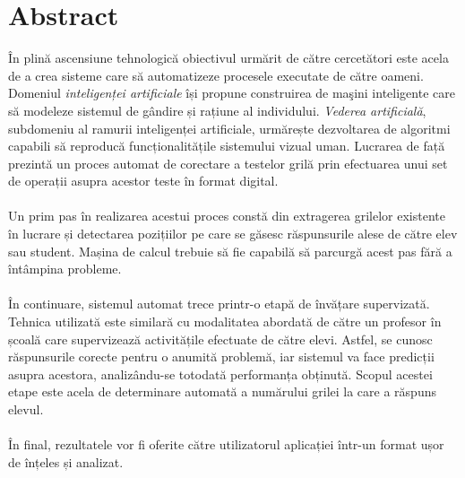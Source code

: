 \documentclass[a4paper,12pt]{report}
\newcommand\tab[1][1cm]{\hspace*{#1}}
\begin{document}
\chapter*{Abstract}
\vspace{2cm}
\tab În plină ascensiune tehnologică obiectivul urmărit de către cercetători este acela de a crea sisteme care să automatizeze procesele executate de către oameni. Domeniul \textit{inteligenței artificiale} își propune construirea de maşini inteligente care să modeleze sistemul de gândire și rațiune al individului. \textit{Vederea artificială}, subdomeniu al ramurii inteligenței artificiale, urmărește dezvoltarea de algoritmi capabili să reproducă funcționalitățile sistemului vizual uman. Lucrarea de față prezintă un proces automat de corectare a testelor grilă prin efectuarea unui set de operații asupra acestor teste în format digital. 
\\ \tab \\ \tab Un prim pas în realizarea acestui proces constă din extragerea grilelor existente în lucrare și detectarea pozițiilor pe care se găsesc răspunsurile alese de către elev sau student. Mașina de calcul trebuie să fie capabilă să parcurgă acest pas fără a întâmpina probleme.
\\ \tab \\ \tab În continuare, sistemul automat trece printr-o etapă de învățare supervizată. Tehnica utilizată este similară cu modalitatea abordată de către un profesor în școală care supervizează activitățile efectuate de către elevi. Astfel, se cunosc răspunsurile corecte pentru o anumită problemă, iar sistemul va face predicții asupra acestora, analizându-se totodată performanța obținută. Scopul acestei etape este acela de determinare automată a numărului grilei la care a răspuns elevul.
\\ \tab \\ \tab În final, rezultatele vor fi oferite către utilizatorul aplicației într-un format ușor de înțeles și analizat.

\chapter*{}
\end{document}
